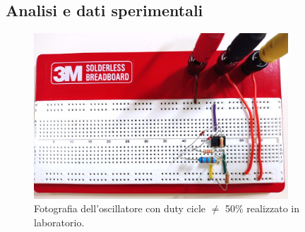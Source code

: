 \documentclass{report}
\begin{document}
\subsection{Analisi e dati sperimentali}
\begin{figure}[h]
	\centering
	\includegraphics[height=6.2cm]{immagini/circuito4_1.jpg}
	\caption{Fotografia dell'oscillatore con duty cicle $\neq$ 50\% realizzato in laboratorio.}
	\label{figura:circuito4}
\end{figure}

\end{document}
